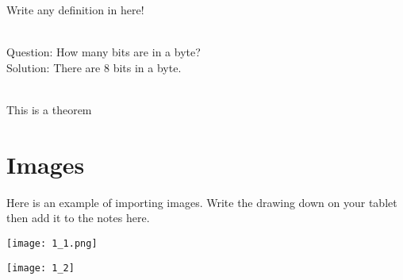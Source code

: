 \documentclass[11pt,fleqn,openany]{book} %
\begin{document}
\begin{definition}
Write any definition in here!
\end{definition}

\begin{example}~\\
  Question: How many bits are in a byte?\\ 
  Solution: There are 8 bits in a byte.
\end{example}

\begin{theorem}~\\
This is a theorem
\end{theorem}


\section{Images}
Here is an example of importing images. Write the drawing down on your tablet then add it to the notes here.\\
\begin{center}
  \texttt{[image: 1\_1.png]}
  \begin{capfig}
  \end{capfig}

  \texttt{[image: 1\_2]}
  \begin{capfig}
  \end{capfig}

\end{center}
\end{document}
